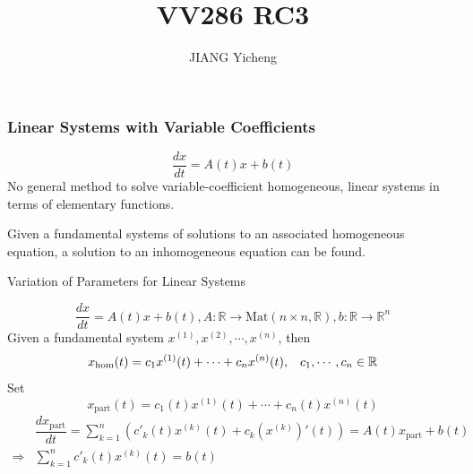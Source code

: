 \documentclass{beamer}
\title{\textcolor[rgb]{0,0.168,0.376}{VV286 RC3}}
\author{JIANG Yicheng}
\begin{document}
\begin{frame}
\titlepage
\end{frame}


\begin{frame}
\frametitle{Linear Systems with Variable Coefficients}
$$\dfrac{dx}{dt}=A(t)x+b(t)$$
No general method to solve variable-coefficient homogeneous, linear systems in terms of elementary functions.
\begin{block}{}
Given a fundamental systems of solutions to an associated homogeneous equation, a solution to an inhomogeneous equation can be found.
\end{block}
\end{frame}

\begin{frame}
\begin{block}{Variation of Parameters for Linear Systems}

\end{block}
$$\dfrac{dx}{dt}=A(t)x+b(t),A:\mathbb{R}\rightarrow\text{Mat}(n\times n,\mathbb{R}),b:\mathbb{R}\rightarrow\mathbb{R}^n$$
Given a fundamental system $x^{(1)},x^{(2)},\cdots,x^{(n)}$, then
$$x_{\text{hom}}(t)=c_1x^{(1)}(t)+\cdots+c_nx^{(n)}(t),\hspace{3mm}c_1,\cdots,c_n\in\mathbb{R}$$
Set
$$x_{\text{part}}(t)=c_1(t)x^{(1)}(t)+\cdots+c_n(t)x^{(n)}(t)$$
\begin{align*}
&\dfrac{dx_{\text{part}}}{dt}=\sum\limits_{k=1}^n(c'_k(t)x^{(k)}(t)+c_k(x^{(k)})'(t))=A(t)x_{\text{part}}+b(t)\\
\Rightarrow &\sum\limits_{k=1}^nc'_k(t)x^{(k)}(t)=b(t)
\end{align*}
\end{frame}
\end{document}
